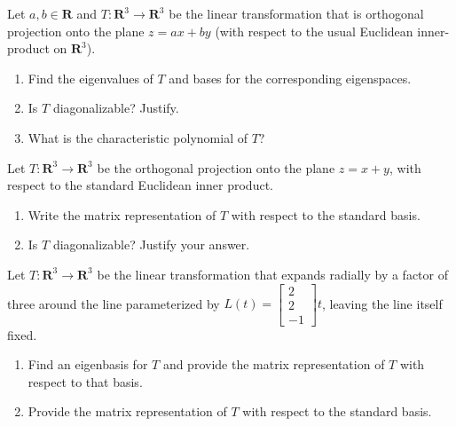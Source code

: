 \documentclass[11pt,twoside,openany]{memoir}
\begin{document}
        \begin{exercise}
        Let $a, b \in \mathbf{R}$ and $T: \mathbf{R}^3 \to \mathbf{R}^3$ be the linear transformation that is orthogonal projection onto the plane $z=ax+by$ (with respect to the usual Euclidean inner-product on $\mathbf{R}^3$).
        \begin{enumerate}[label=(\alph*)]
            \item Find the eigenvalues of $T$ and bases for the corresponding eigenspaces.
            \item Is $T$ diagonalizable? Justify.
            \item What is the characteristic polynomial of $T$?
        \end{enumerate}
        \end{exercise}
        
        \begin{exercise}
        Let $T:\mathbf{R}^3\to \mathbf{R}^3$ be the orthogonal projection onto the plane $z=x+y$, with respect to the standard Euclidean inner product.
        \begin{enumerate}[label=(\alph*)]
            \item Write the matrix representation of $T$ with respect to the standard basis.
            \item Is $T$ diagonalizable? Justify your answer.
        \end{enumerate}
        \end{exercise}
        \newpage
        
        \begin{exercise}
        Let $T:\mathbf{R}^3\to \mathbf{R}^3$ be the linear transformation that expands radially by a factor of three around the line parameterized by $L(t)=\begin{bmatrix} 2 \\ 2 \\ -1\end{bmatrix} t$, leaving the line itself fixed.
        \begin{enumerate}[label=(\alph*)]
            \item Find an eigenbasis for $T$ and provide the matrix representation of $T$ with respect to that basis.
            \item Provide the matrix representation of $T$ with respect to the standard basis.
        \end{enumerate}
        \end{exercise}
        
\end{document}
